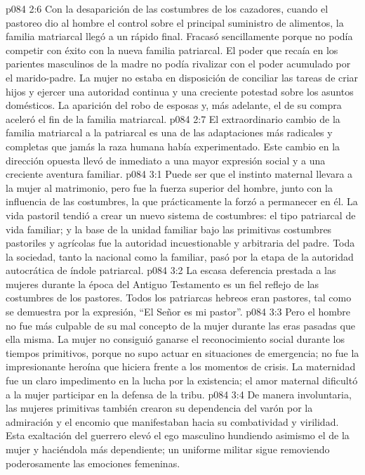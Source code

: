 \vs p084 2:6 Con la desaparición de las costumbres de los cazadores, cuando el pastoreo dio al hombre el control sobre el principal suministro de alimentos, la familia matriarcal llegó a un rápido final. Fracasó sencillamente porque no podía competir con éxito con la nueva familia patriarcal. El poder que recaía en los parientes masculinos de la madre no podía rivalizar con el poder acumulado por el marido\hyp{}padre. La mujer no estaba en disposición de conciliar las tareas de criar hijos y ejercer una autoridad continua y una creciente potestad sobre los asuntos domésticos. La aparición del robo de esposas y, más adelante, el de su compra aceleró el fin de la familia matriarcal.
\vs p084 2:7 El extraordinario cambio de la familia matriarcal a la patriarcal es una de las adaptaciones más radicales y completas que jamás la raza humana había experimentado. Este cambio en la dirección opuesta llevó de inmediato a una mayor expresión social y a una creciente aventura familiar.
\vs p084 3:1 Puede ser que el instinto maternal llevara a la mujer al matrimonio, pero fue la fuerza superior del hombre, junto con la influencia de las costumbres, la que prácticamente la forzó a permanecer en él. La vida pastoril tendió a crear un nuevo sistema de costumbres: el tipo patriarcal de vida familiar; y la base de la unidad familiar bajo las primitivas costumbres pastoriles y agrícolas fue la autoridad incuestionable y arbitraria del padre. Toda la sociedad, tanto la nacional como la familiar, pasó por la etapa de la autoridad autocrática de índole patriarcal.
\vs p084 3:2 La escasa deferencia prestada a las mujeres durante la época del Antiguo Testamento es un fiel reflejo de las costumbres de los pastores. Todos los patriarcas hebreos eran pastores, tal como se demuestra por la expresión, “El Señor es mi pastor”.
\vs p084 3:3 Pero el hombre no fue más culpable de su mal concepto de la mujer durante las eras pasadas que ella misma. La mujer no consiguió ganarse el reconocimiento social durante los tiempos primitivos, porque no supo actuar en situaciones de emergencia; no fue la impresionante heroína que hiciera frente a los momentos de crisis. La maternidad fue un claro impedimento en la lucha por la existencia; el amor maternal dificultó a la mujer participar en la defensa de la tribu.
\vs p084 3:4 De manera involuntaria, las mujeres primitivas también crearon su dependencia del varón por la admiración y el encomio que manifestaban hacia su combatividad y virilidad. Esta exaltación del guerrero elevó el ego masculino hundiendo asimismo el de la mujer y haciéndola más dependiente; un uniforme militar sigue removiendo poderosamente las emociones femeninas.

